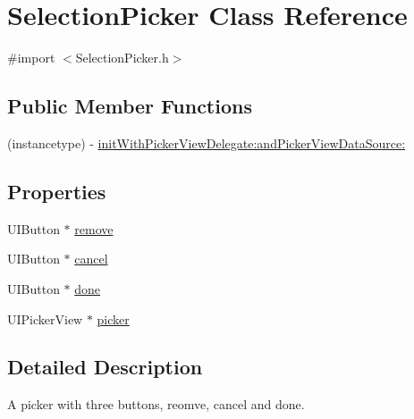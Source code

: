 \hypertarget{interface_selection_picker}{\section{\-Selection\-Picker \-Class \-Reference}
\label{interface_selection_picker}
}


{\ttfamily \#import $<$\-Selection\-Picker.\-h$>$}

\subsection*{\-Public \-Member \-Functions}
\begin{DoxyCompactItemize}
\item 
(instancetype) -\/ \hyperlink{interface_selection_picker_ad5fcb03fe065cf8fcaf765825562cfc1}{init\-With\-Picker\-View\-Delegate\-:and\-Picker\-View\-Data\-Source\-:}
\end{DoxyCompactItemize}
\subsection*{\-Properties}
\begin{DoxyCompactItemize}
\item 
\-U\-I\-Button $\ast$ \hyperlink{interface_selection_picker_a060c08f65fc47029ed1902e796a03925}{remove}
\item 
\-U\-I\-Button $\ast$ \hyperlink{interface_selection_picker_ad419e9278ed75268dda0e48c5ce43822}{cancel}
\item 
\-U\-I\-Button $\ast$ \hyperlink{interface_selection_picker_aa43b12e68fd0c7c20745380fc60b6b88}{done}
\item 
\-U\-I\-Picker\-View $\ast$ \hyperlink{interface_selection_picker_aa2a3f2d050d8e454ee7158ab17735c5f}{picker}
\end{DoxyCompactItemize}


\subsection{\-Detailed \-Description}
\-A picker with three buttons, reomve, cancel and done. 

